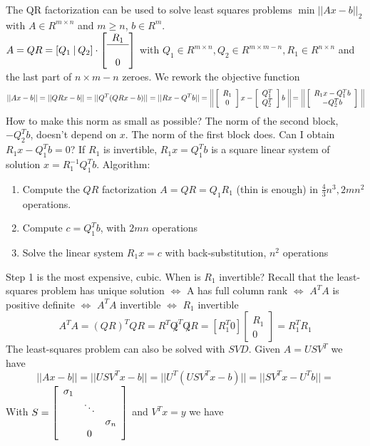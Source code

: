 \documentclass[10pt]{report}
\begin{document}
The QR factorization can be used to solve least squares problems $\min ||Ax-b||_2$ with $A\in R^{m\times n}$ and $m\geq n$, $b\in R^m$.\\$A=QR = [Q_1\:|\:Q_2]\cdot\left[\begin{array}{c}
R_1\\\hline\\0
\end{array}\right]$ with $Q_1\in R^{m\times n}, Q_2\in R^{m\times m-n}, R_1\in R^{n\times n}$ and the last part of $n\times m-n$ zeroes. We rework the objective function $$||Ax-b|| = ||QRx-b||=||Q^T(QRx-b)||=||Rx-Q^Tb|| = \:\:\vline\:\vline\left[\begin{array}{c}
R_1\\0
\end{array}\right]x-\left[\begin{array}{c}
Q_1^T\\Q_2^T
\end{array}\right]b\:\:\vline\:\vline = \:\:\vline\:\vline\left[\begin{array}{c}
R_1x-Q_1^Tb\\-Q_2^Tb
\end{array}\right]\:\:\vline\:\vline$$
How to make this norm as small as possible? The norm of the second block, $-Q_2^Tb$, doesn't depend on $x$. The norm of the first block does. Can I obtain $R_1x - Q_1^Tb = 0$? If $R_1$ is invertible, $R_1x=Q_1^Tb$ is a square linear system of solution $x = R_1^{-1}Q_1^Tb$. Algorithm:
\begin{enumerate}
	\item Compute the $QR$ factorization $A = QR = Q_1R_1$ (thin is enough) in $\frac{4}{3}n^3,2mn^2$ operations.
	\item Compute $c = Q_1^Tb$, with $2mn$ operations
	\item Solve the linear system $R_1x=c$ with back-substitution, $n^2$ operations
\end{enumerate}
Step 1 is the most expensive, cubic. When is $R_1$ invertible? Recall that the least-squares problem has unique solution $\Leftrightarrow$ A has full column rank $\Leftrightarrow$ $A^TA$ is positive definite $\Leftrightarrow$ $A^TA$ invertible $\Leftrightarrow$ $R_1$ invertible
$$A^TA = (QR)^TQR = R^T\not Q^T\not QR = [R_1^T 0]\left[\begin{array}{c}
R_1\\0
\end{array}\right] = R_1^TR_1$$
The least-squares problem can also be solved with $SVD$. Given $A=USV^T$ we have $$||Ax-b|| = ||USV^Tx-b|| = ||U^T(USV^Tx - b)|| = ||SV^Tx-U^Tb|| =$$
With $S =\left[\begin{array}{c c c}
\sigma_1\\
& \ddots\\
& & \sigma_n\\
& 0
\end{array}\right]$ and $V^Tx = y$ we have
\end{document}
